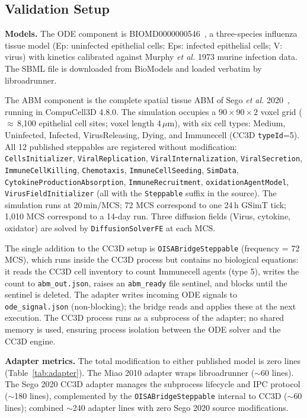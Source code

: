 \documentclass[conference,letterpaper,10pt]{IEEEtran}
\begin{document}
\subsection{Validation Setup}\label{sec:valid-setup}

\textbf{Models.} The ODE component is
BIOMD0000000546~\cite{miao2010influenza}, a three-species influenza
tissue model (Ep: uninfected epithelial cells; Eps: infected epithelial
cells; V: virus) with kinetics calibrated against Murphy \emph{et al.}
1973 murine infection data. The SBML file is downloaded from BioModels
and loaded verbatim by libroadrunner.

The ABM component is the complete spatial tissue ABM of Sego \emph{et
al.} 2020~\cite{sego2020modular}, running in CompuCell3D 4.8.0. The
simulation occupies a $90{\times}90{\times}2$ voxel grid
($\approx$\,8{,}100 epithelial cell sites; voxel length 4\,$\mu$m), with
six cell types: Medium, Uninfected, Infected, VirusReleasing, Dying,
and Immunecell (CC3D \texttt{typeId}=5). All 12 published steppables
are registered without modification: \texttt{CellsInitializer},
\texttt{ViralReplication}, \texttt{ViralInternalization},
\texttt{ViralSecretion}, \texttt{ImmuneCellKilling},
\texttt{Chemotaxis}, \texttt{ImmuneCellSeeding},
\texttt{SimData}, \texttt{CytokineProductionAbsorption},
\texttt{ImmuneRecruitment}, \texttt{oxidationAgentModel},
\texttt{VirusFieldInitializer} (all with the \texttt{Steppable} suffix
in the source).
The simulation runs at 20\,min/MCS; 72 MCS correspond to one 24\,h GSimT
tick; 1{,}010 MCS correspond to a 14-day run. Three diffusion fields
(Virus, cytokine, oxidator) are solved by \texttt{DiffusionSolverFE} at
each MCS.

The single addition to the CC3D setup is \texttt{OISABridgeSteppable}
(frequency = 72\,MCS), which runs inside the CC3D process but contains
no biological equations: it reads the CC3D cell inventory to count
Immunecell agents (type 5), writes the count to \texttt{abm\_out.json},
raises an \texttt{abm\_ready} file sentinel, and blocks until the
sentinel is deleted. The adapter writes incoming ODE signals to
\texttt{ode\_signal.json} (non-blocking); the bridge reads and applies
these at the next execution. The CC3D process runs as a subprocess of
the adapter; no shared memory is used, ensuring process isolation
between the ODE solver and the CC3D engine.

\textbf{Adapter metrics.} The total modification to either published
model is zero lines (Table~\ref{tab:adapter}). The Miao 2010 adapter
wraps libroadrunner ($\sim$60 lines). The Sego 2020 CC3D adapter
manages the subprocess lifecycle and IPC protocol ($\sim$180 lines),
complemented by the \texttt{OISABridgeSteppable} internal to CC3D
($\sim$60 lines); combined $\sim$240 adapter lines with zero Sego 2020
source modifications.
\end{document}
